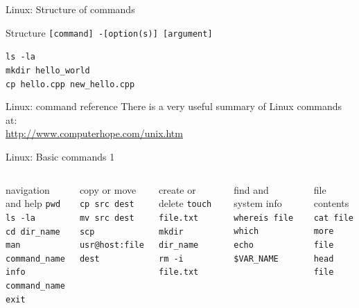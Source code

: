 \documentclass{beamer}
\begin{document}
\begin{frame}{Linux: Structure of commands}
  \begin{block}{Structure}
    \texttt{[command] -[option(s)] [argument]}
  \end{block}
  \begin{Examples}
     \texttt{ls -la \\
     mkdir hello\_world \\
     cp hello.cpp new\_hello.cpp} \\
  \end{Examples}
\end{frame}

\begin{frame}{Linux: command reference}
There is a very useful summary of Linux commands at: \\
\url{http://www.computerhope.com/unix.htm}
\end{frame}


\begin{frame}{Linux: Basic commands 1}
  \begin{columns}
    \begin{block}{navigation and help}
      \texttt{pwd} \\
      \texttt{ls -la} \\
      \texttt{cd dir\_name} \\
      \texttt{man command\_name} \\
      \texttt{info command\_name} \\
      \texttt{exit}
    \end{block}
    \begin{block}{copy or move}
      \texttt{cp src dest} \\
      \texttt{mv src dest} \\
      \texttt{scp usr@host:file dest}
    \end{block}

    \begin{block}{create or delete}
      \texttt{touch file.txt} \\ 
      \texttt{mkdir dir\_name} \\ 
      \texttt{rm -i file.txt}
    \end{block}
    \begin{block}{find and system info}
      \texttt{whereis file} \\
      \texttt{which} \\
      \texttt{echo \$VAR\_NAME}
    \end{block}
    \begin{block}{file contents}
      \texttt{cat file} \\
      \texttt{more file} \\
      \texttt{head file}
    \end{block}    
  \end{columns}
\end{frame}
\end{document}
